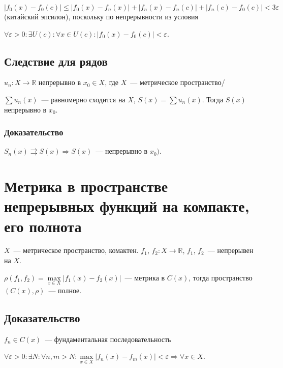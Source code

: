 \documentclass{article}
\begin{document}
            $| f_0(x) - f_0(c) | \leq | f_0(x) - f_n(x) | + | f_n(x) - f_n(c) | + | f_n(c) - f_0(c) | < 3 \varepsilon$ (китайский эпсилон), поскольку по непрерывности из условия
            
            $\forall \varepsilon > 0 : \exists U(c) : \forall x \in U(c) : | f_0(x) - f_0(c) | < \varepsilon$.
            
        \subsection{Следствие для рядов}
        
            $u_n : X \rightarrow \mathbb{R}$ непрерывно в $x_0 \in X$, где $X$~--- метрическое пространство/
            
            $\sum u_n(x)$~--- равномерно сходится на $X$, $S(x) = \sum u_n(x)$. Тогда $S(x)$ непрерывно в $x_0$.
            
            \subsubsection{Доказательство}
        
                $S_n(x) \rightrightarrows S(x) \Rightarrow S(x)$~--- непрерывно в $x_0)$.
            
    \newpage
    
    \section{Метрика в пространстве непрерывных функций на компакте, его полнота}
    
        $X$~--- метрическое пространство, комактен. $f_1$, $f_2 : X \rightarrow \mathbb{R}$, $f_1$, $f_2$~--- непрерывен на $X$.
        
        $\rho(f_1, f_2) = \max\limits_{x \in X} | f_1(x) - f_2(x) |$~--- метрика в $C(x)$, тогда пространство $(C(x), \rho)$~--- полное.
        
        \subsection{Доказательство}
        
            $f_n \in C(x)$~--- фундаментальная последовательность
        
            $\forall \varepsilon > 0 : \exists N : \forall n, m > N : \max\limits_{x \in X} \left| f_n(x) - f_m(x) \right| < \varepsilon \Rightarrow \forall x \in X$.
            
\end{document}
